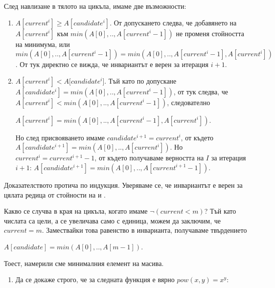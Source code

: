 {\begin{mdframed}[hidealllines=true,backgroundcolor=gray!20]
След навлизане в тялото на цикъла, имаме две възможности:
\begin{enumerate}[label=\arabic*)]
  \item $A[current^i]\geq A[candidate^i]$. От допускането следва, че добавянето на $A[current^i]$ към $min(A[0],..,A[current^i-1])$ не променя стойността на минимума, или $min(A[0],..,A[current^i-1])=min(A[0],..,A[current^i-1],A[current^i])$. От тук директно се вижда, че инвариантът е верен за итерация $i+1$.
  \item $A[current^i] < A[candidate^i$]. Тъй като по допускане $A[candidate^i] = min(A[0], .., A[current^i-1])$, от тук следва, че $A[current^i] < min(A[0], .., A[current^i-1])$, следователно

   $A[current^i] = min(A[0], .., A[current^i-1], A[current^i])$.

   Но след присвояването имаме $candidate^{i+1} = current^i$, от където $A[candidate^{i+1}] = min(A[0],..,A[current^i])$. Но $current^i = current^{i+1}-1$, от където получаваме верността на $I$ за итерация $i+1$: $A[candidate^{i+1}] = min(A[0], .., A[current^{i+1}-1])$.

\end{enumerate}
  Доказателството протича по индукция. Уверяваме се, че инвариантът е верен за цялата редица от стойности на  и .

  Какво се случва в края на цикъла, когато имаме $\neg(current<m)$? Тъй като числата са цели, а  се увеличава само с единица, можем да заключим, че $current=m$. Замествайки това равенство в инварианта, получаваме твърдението

  $A[candidate] = min(A[0], .., A[m-1])$.

  Тоест, намерили сме минималния елемент на масива.
\end{mdframed}

\begin{enumerate}[resume]
  \item Да се докаже строго, че за следната функция е вярно $pow(x,y)=x^y$:
  \begin{enumerate}[label=\alph*)]%


\end{enumerate}
\end{enumerate}}

